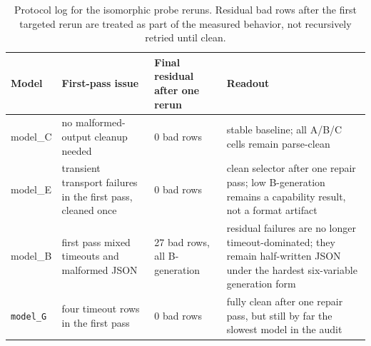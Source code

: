 \begin{table}[t]
\caption{Protocol log for the isomorphic probe reruns. Residual bad rows after the first targeted rerun are treated as part of the measured behavior, not recursively retried until clean.}
\label{tab:appendix_isomorphic_protocol}
\centering
\scriptsize
\setlength{\tabcolsep}{3pt}
\renewcommand{\arraystretch}{1.08}
\begin{tabularx}{\textwidth}{p{28mm}Y p{28mm}Y}
\toprule
Model & First-pass issue & Final residual after one rerun & Readout \\
\midrule
model_C & no malformed-output cleanup needed & 0 bad rows & stable baseline; all A/B/C cells remain parse-clean \\
model_E & transient transport failures in the first pass, cleaned once & 0 bad rows & clean selector after one repair pass; low B-generation remains a capability result, not a format artifact \\
model_B & first pass mixed timeouts and malformed JSON & 27 bad rows, all B-generation & residual failures are no longer timeout-dominated; they remain half-written JSON under the hardest six-variable generation form \\
\texttt{model_G} & four timeout rows in the first pass & 0 bad rows & fully clean after one repair pass, but still by far the slowest model in the audit \\
\bottomrule
\end{tabularx}
\end{table}
